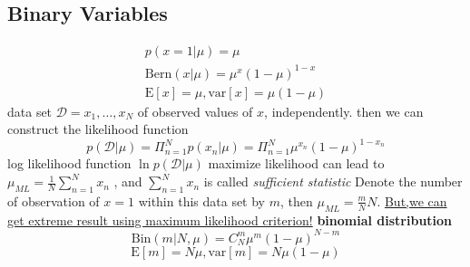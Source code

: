 \documentclass[a4paper]{book}
\begin{document}
\subsection{Binary Variables}
\begin{gather}\label{eq1.2.1}
  p(x=1|\mu) = \mu \\
  \mathrm {Bern}(x|\mu) = \mu^x(1-\mu)^{1-x} \\
  \mathrm E[x] = \mu, \mathrm  {var}[x]=\mu(1-\mu)
\end{gather}
data set $\mathcal D={x_1,\dots,x_N}$ of observed values of $x$, independently.\newline
then we can construct the likelihood function
\begin{equation}\label{1.2.2}
p(\mathcal D|\mu) = \Pi_{n=1}^Np(x_n|\mu) = \Pi_{n=1}^N\mu^{x_n}(1-\mu)^{1-x_n}
\end{equation}
log likelihood function $\ln p(\mathcal D|\mu)$\newline
maximize likelihood can lead to $\mu_{ML} = \frac1N\sum_{n=1}^Nx_n$ , and $\sum_{n=1}^Nx_n$ is called \emph{sufficient statistic}\newline
Denote the number of observation of $x = 1 $ within this data set by $m$, then  $\mu_{ML}=\frac mNN$. \newline
\uline{But,we can get extreme result using maximum likelihood criterion!}
\textbf{binomial distribution}
$$\mathrm{Bin}(m|N,\mu) = C_N^m\mu^m(1-\mu)^{N-m} $$
$$\mathrm E[m]=N\mu, \mathrm  {var}[m]=N\mu(1-\mu)$$
\end{document}
